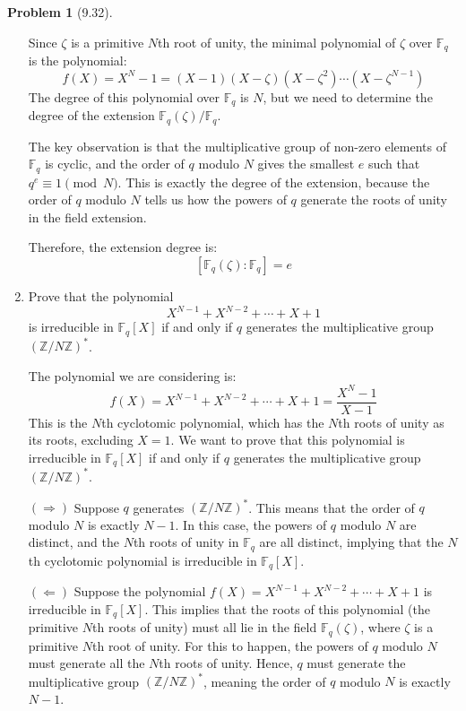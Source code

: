 \documentclass[12pt]{article}
\theoremstyle{definition}
\newtheorem{problem}{Problem}
\begin{document}
\begin{problem}[9.32]
\begin{enumerate}[label=(\alph*)]
\begin{solution}
            Since $\zeta$ is a primitive $N$th root of unity, the minimal polynomial of $\zeta$ over $\mathbb{F}_q$ is the polynomial:
            \[
            f(X) = X^N - 1 = (X-1)(X-\zeta)(X-\zeta^2)\cdots(X-\zeta^{N-1})
            \]
            The degree of this polynomial over $\mathbb{F}_q$ is $N$, but we need to determine the degree of the extension $\mathbb{F}_q(\zeta)/\mathbb{F}_q$.

            The key observation is that the multiplicative group of non-zero elements of $\mathbb{F}_q$ is cyclic, and the order of $q$ modulo $N$ gives the smallest $e$ such that $q^e \equiv 1 \pmod{N}$. This is exactly the degree of the extension, because the order of $q$ modulo $N$ tells us how the powers of $q$ generate the roots of unity in the field extension.

            Therefore, the extension degree is:
            \[
            [\mathbb{F}_q(\zeta) : \mathbb{F}_q] = e
            \]
        \end{solution}

        \item Prove that the polynomial
              \[
                  X^{N-1} + X^{N-2} + \cdots + X + 1
              \]
            is irreducible in $\mathbb{F}_q[X]$ if and only if $q$ generates the multiplicative group $(\mathbb{Z}/N\mathbb{Z})^*$.
        
        \begin{solution}
            The polynomial we are considering is:
            \[
            f(X) = X^{N-1} + X^{N-2} + \cdots + X + 1 = \frac{X^N - 1}{X - 1}
            \]
            This is the $N$th cyclotomic polynomial, which has the $N$th roots of unity as its roots, excluding $X = 1$. We want to prove that this polynomial is irreducible in $\mathbb{F}_q[X]$ if and only if $q$ generates the multiplicative group $(\mathbb{Z}/N\mathbb{Z})^*$.

            $(\Rightarrow)$ Suppose $q$ generates $(\mathbb{Z}/N\mathbb{Z})^*$. This means that the order of $q$ modulo $N$ is exactly $N-1$. In this case, the powers of $q$ modulo $N$ are distinct, and the $N$th roots of unity in $\mathbb{F}_q$ are all distinct, implying that the $N$th cyclotomic polynomial is irreducible in $\mathbb{F}_q[X]$.

            $(\Leftarrow)$ Suppose the polynomial $f(X) = X^{N-1} + X^{N-2} + \cdots + X + 1$ is irreducible in $\mathbb{F}_q[X]$. This implies that the roots of this polynomial (the primitive $N$th roots of unity) must all lie in the field $\mathbb{F}_q(\zeta)$, where $\zeta$ is a primitive $N$th root of unity. For this to happen, the powers of $q$ modulo $N$ must generate all the $N$th roots of unity. Hence, $q$ must generate the multiplicative group $(\mathbb{Z}/N\mathbb{Z})^*$, meaning the order of $q$ modulo $N$ is exactly $N-1$.


\end{solution}
\end{enumerate}
\end{problem}
\end{document}
